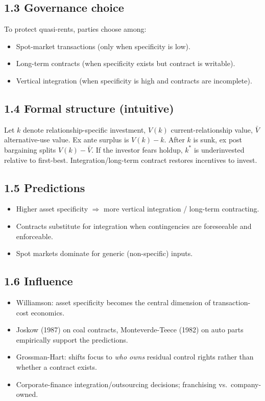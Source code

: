 \documentclass[11pt]{article}
\begin{document}
\subsection*{1.3 Governance choice}
To protect quasi-rents, parties choose among:
\begin{itemize}
\item Spot-market transactions (only when specificity is low).
\item Long-term contracts (when specificity exists but contract is writable).
\item Vertical integration (when specificity is high and contracts are incomplete).
\end{itemize}

\subsection*{1.4 Formal structure (intuitive)}
Let $k$ denote relationship-specific investment, $V(k)$ current-relationship value, $\bar V$ alternative-use value. Ex ante surplus is $V(k) - k$. After $k$ is sunk, ex post bargaining splits $V(k) - \bar V$. If the investor fears holdup, $k^*$ is underinvested relative to first-best. Integration/long-term contract restores incentives to invest.

\subsection*{1.5 Predictions}
\begin{itemize}
\item Higher asset specificity $\Rightarrow$ more vertical integration / long-term contracting.
\item Contracts substitute for integration when contingencies are foreseeable and enforceable.
\item Spot markets dominate for generic (non-specific) inputs.
\end{itemize}

\subsection*{1.6 Influence}
\begin{itemize}
\item Williamson: asset specificity becomes the central dimension of transaction-cost economics.
\item Joskow (1987) on coal contracts, Monteverde-Teece (1982) on auto parts empirically support the predictions.
\item Grossman-Hart: shifts focus to \emph{who owns} residual control rights rather than whether a contract exists.
\item Corporate-finance integration/outsourcing decisions; franchising vs.\ company-owned.
\end{itemize}
\end{document}
